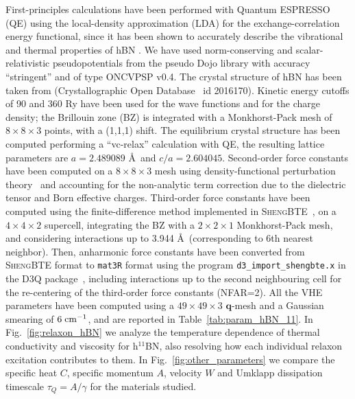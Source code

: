 \documentclass[
prb,
twocolumn,
superscriptaddress,
 amsmath,amssymb,
 aps,
longbibliography,
]{revtex4-2}
\begin{document}
First-principles calculations have been performed with Quantum ESPRESSO (QE) \cite{giannozzi2009quantum,giannozzi2017advanced} using the local-density approximation (LDA) for the exchange-correlation energy functional, since it has been shown to accurately describe the vibrational and thermal properties of hBN \cite{jiang_anisotropic_2018,PhysRevB.97.155435,yuan_modulating_2019}.
We have used norm-conserving and scalar-relativistic pseudopotentials
 from the pseudo Dojo library \cite{van2018pseudodojo}
with accuracy ``stringent'' and of type ONCVPSP v0.4.
The crystal structure of hBN has been taken from \cite{Kurakevych:sq3084} (Crystallographic Open Database~ \cite{COD_database} id 2016170).
Kinetic energy cutoffs of 90 and 360 Ry have been used for the wave functions and for the charge density; the Brillouin zone (BZ) is integrated with a Monkhorst-Pack mesh of $8{\times}8{\times}3$ points, with a (1,1,1) shift.
The equilibrium crystal structure has been computed performing a ``vc-relax'' calculation with QE, the resulting lattice parameters are $a=2.489089$ \AA ~and $c/a=2.604045$.
Second-order force constants have been computed on a $8{\times}8{\times}3$ mesh using density-functional perturbation theory~\cite{RevModPhys.73.515} and accounting for the non-analytic term correction due to the dielectric tensor and Born effective charges.
Third-order force constants have been computed using the finite-difference method implemented in \textsc{ShengBTE}~\cite{li2014shengbte}, on a $4{\times}4{\times}2$ supercell, integrating the BZ with a $2{\times}2{\times}1$ Monkhorst-Pack mesh, and considering interactions up to 3.944 \AA~(corresponding to 6th nearest neighbor).
Then, anharmonic force constants have been converted from \textsc{ShengBTE} format to \texttt{mat3R} format using the program \texttt{d3\_import\_shengbte.x} in the \textsc{D3Q} package~\cite{paulatto2013anharmonic,paulatto2015first}, including interactions up to the second neighbouring cell for the re-centering of the third-order force constants (NFAR=2).
All the VHE parameters have been computed using a $49{\times}49{\times}3$ $\bm{q}$-mesh  and a Gaussian smearing of $6\;{\rm cm}^{-1}$, and are reported in Table~\ref{tab:param_hBN_11}. In Fig.~\ref{fig:relaxon_hBN} we analyze the temperature dependence of thermal conductivity and viscosity for h$^{11}$BN, also resolving how each individual relaxon excitation contributes to them. In Fig.~\ref{fig:other_parameters} we compare the specific heat $C$, specific momentum $A$, velocity $W$ and Umklapp dissipation timescale $\tau_Q=A/\gamma$ for the materials studied.
\end{document}
